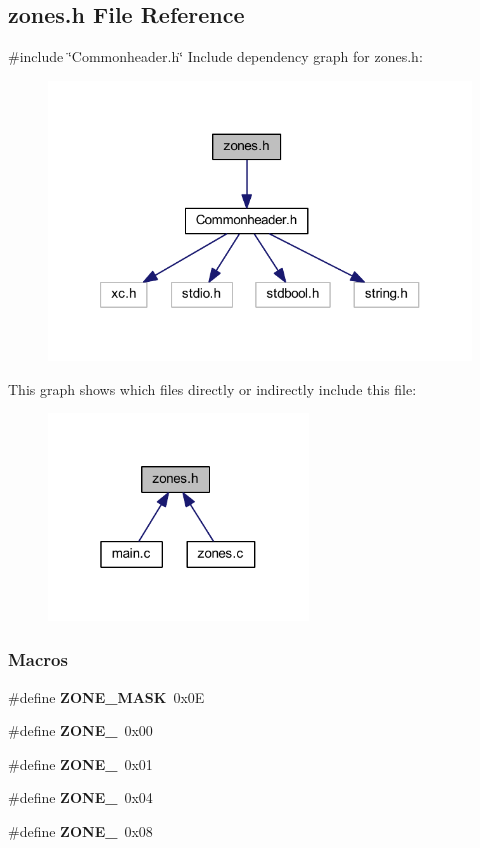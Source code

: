 \subsection{zones.\+h File Reference}
\label{a00062}
{\ttfamily \#include \char`\"{}Commonheader.\+h\char`\"{}}\newline
Include dependency graph for zones.\+h\+:
\nopagebreak
\begin{figure}[H]
\begin{center}
\leavevmode
\includegraphics[width=321pt]{a00063}
\end{center}
\end{figure}
This graph shows which files directly or indirectly include this file\+:
\nopagebreak
\begin{figure}[H]
\begin{center}
\leavevmode
\includegraphics[width=196pt]{a00064}
\end{center}
\end{figure}
\subsubsection*{Macros}
\begin{DoxyCompactItemize}
\item 
\#define \textbf{ Z\+O\+N\+E\+\_\+\+M\+A\+SK}~0x0E
\item 
\#define \textbf{ Z\+O\+N\+E\+\_}~0x00
\item 
\#define \textbf{ Z\+O\+N\+E\+\_}~0x01
\item 
\#define \textbf{ Z\+O\+N\+E\+\_}~0x04
\item 
\#define \textbf{ Z\+O\+N\+E\+\_}~0x08
\end{DoxyCompactItemize}
